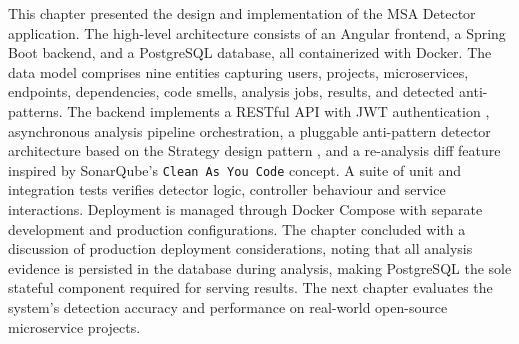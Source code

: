  \par This chapter presented the design and implementation of the MSA Detector application. The high-level architecture consists of an Angular frontend, a Spring Boot backend, and a PostgreSQL database, all containerized with Docker. The data model comprises nine entities capturing users, projects, microservices, endpoints, dependencies, code smells, analysis jobs, results, and detected anti-patterns. The backend implements a RESTful API \cite{Fielding2000} with JWT authentication \cite{RFC7519}, asynchronous analysis pipeline orchestration, a pluggable anti-pattern detector architecture based on the Strategy design pattern \cite{Gamma1994}, and a re-analysis diff feature inspired by SonarQube's \texttt{Clean As You Code} concept. A suite of unit and integration tests verifies detector logic, controller behaviour and service interactions. Deployment is managed through Docker Compose with separate development and production configurations. The chapter concluded with a discussion of production deployment considerations, noting that all analysis evidence is persisted in the database during analysis, making PostgreSQL the sole stateful component required for serving results. The next chapter evaluates the system's detection accuracy and performance on real-world open-source microservice projects.